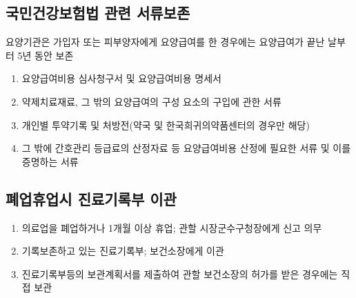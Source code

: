 \subsection{국민건강보험법 관련 서류보존} 
요양기관은 가입자 또는 피부양자에게 요양급여를 한 경우에는 요양급여가 끝난 날부터 5년 동안 보존 
\begin{enumerate}\tightlist
\item 요양급여비용 심사청구서 및 요양급여비용 명세서
\item 약제\cntrdot{}치료재료, 그 밖의 요양급여의 구성 요소의 구입에 관한 서류
\item 개인별 투약기록 및 처방전(약국 및 한국희귀의약품센터의 경우만 해당)
\item 그 밖에 간호관리 등급료의 산정자료 등 요양급여비용 산정에 필요한 서류 및 이를 증명하는 서류 
\end{enumerate}

\subsection{폐업\cntrdot{}휴업시 진료기록부 이관}
\begin{enumerate}\tightlist
\item 의료업을 폐업하거나 1개월 이상 휴업;  관할 시장\cntrdot{}군수\cntrdot{}구청장에게 신고 의무
\item 기록\cntrdot{}보존하고 있는 진료기록부; 보건소장에게 이관 
\item 진료기록부등의 보관계획서를 제출하여 관할 보건소장의 허가를 받은 경우에는 직접 보관
\end{enumerate}